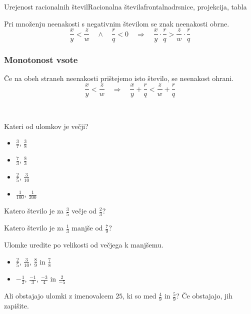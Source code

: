 \begin{priprava}{7}{}{Urejenost racionalnih števil}{Racionalna števila}{frontalna}{drsnice, projekcija, tabla}
    

    Pri množenju neenakosti s negativnim številom se znak neenakosti obrne.
    $$ \dfrac{x}{y}<\dfrac{z}{w} \quad \wedge \quad \dfrac{r}{q}<0 \quad \Rightarrow \quad \dfrac{x}{y}\cdot\dfrac{r}{q}>\dfrac{z}{w}\cdot\dfrac{r}{q} $$


    \subsubsection*{Monotonost vsote}
    Če na obeh straneh neenakosti prištejemo isto število, se neenakost ohrani.
    $$ \dfrac{x}{y}<\dfrac{z}{w} \quad \Rightarrow \quad \dfrac{x}{y}+\dfrac{r}{q}<\dfrac{z}{w}+\dfrac{r}{q} $$


    ~
    \begin{naloga}
        Kateri od ulomkov je večji?
        \begin{itemize}
            \item $\frac{3}{7}$, $\frac{3}{8}$ 
            \item $\frac{7}{3}$, $\frac{8}{3}$ 
            \item $\frac{2}{5}$, $\frac{3}{10}$ 
            \item $\frac{1}{100}$, $\frac{1}{200}$ 
        \end{itemize}
    \end{naloga}

    \begin{naloga}
        Katero število je za $\frac{3}{5}$ večje od $\frac{2}{3}$?
        
    \end{naloga}

    \begin{naloga}
        Katero število je za $\frac{1}{3}$ manjše od $\frac{7}{9}$?
        
    \end{naloga}

    \begin{naloga}
        Ulomke uredite po velikosti od večjega k manjšemu.
        \begin{itemize}
            \item $\frac{2}{5}$, $\frac{3}{10}$, $\frac{8}{9}$ in $\frac{7}{8}$ 
            \item $-\frac{1}{2}$, $\frac{-1}{3}$, $\frac{-3}{4}$ in $\frac{2}{-5}$ 
        \end{itemize}
    \end{naloga}


    \begin{naloga}
        Ali obstajajo ulomki z imenovalcem $25$, ki so med $\frac{4}{9}$ in $\frac{5}{9}$? Če obstajajo, jih zapišite.
        

\end{naloga}
\end{priprava}
